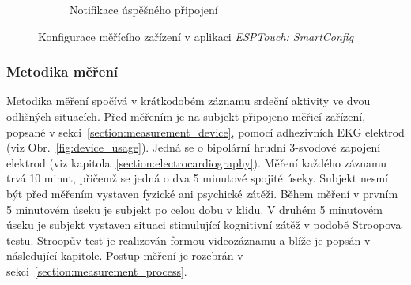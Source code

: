 \begin{figure}[h]
\begin{subfigure}[b]{0.45\textwidth}
        \textcolor{cyan}{\fboxrule=2pt\fboxsep=0pt}
        \caption{Notifikace úspěšného připojení}
        \label{fig:app_screen2}
    \end{subfigure}
    \caption{Konfigurace měřícího zařízení v aplikaci \textit{ESPTouch:
            SmartConfig}}
    \label{fig:esptouch_app}
\end{figure}

\subsubsection{Metodika měření}
\label{section:measurement_methodology}
Metodika měření spočívá v krátkodobém záznamu srdeční aktivity ve dvou odlišných
situacích. Před měřením je na subjekt připojeno měřicí zařízení, popsané v
sekci~\ref{section:measurement_device}, pomocí adhezivních EKG elektrod (viz
Obr.~\ref{fig:device_usage}). Jedná se o bipolární hrudní 3-svodové zapojení
elektrod (viz kapitola~\ref{section:electrocardiography}). Měření každého
záznamu trvá 10 minut, přičemž se jedná o dva 5 minutové spojité úseky. Subjekt
nesmí být před měřením vystaven fyzické ani psychické zátěži. Během měření v
prvním 5 minutovém úseku je subjekt po celou dobu v klidu. V druhém 5 minutovém
úseku je subjekt vystaven situaci stimulující kognitivní zátěž v podobě
Stroopova testu. Stroopův test je realizován formou videozáznamu a blíže je
popsán v následující kapitole. Postup měření je rozebrán v
sekci~\ref{section:measurement_process}.

